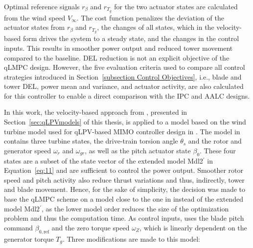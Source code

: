 Optimal reference signals $r_\beta$ and $r_{T_g}$ for the two actuator states are calculated from the wind speed $V_\infty$. The cost function penalizes the deviation of the actuator states from $r_\beta$ and $r_{T_g}$, the changes of all states, which in the velocity-based form drives the system to a steady state, and the changes in the control inputs. This results in smoother power output and reduced tower movement compared to the baseline. DEL reduction is not an explicit objective of the qLMPC design. However, the five evaluation criteria used to compare all control strategies introduced in Section~\ref{subsection Control Objectives}, i.e., blade and tower DEL, power mean and variance, and actuator activity, are also calculated for this controller to enable a direct comparison with the IPC and AALC designs.

In this work, the velocity-based approach from \cite{cisneros2020velocity}, presented in Section~\ref{sec:qLPVmodels} of this thesis, is applied to a model based on the wind turbine model used for qLPV-based MIMO controller design in \cite{Bianchi2007}. The model in \cite{Bianchi2007} contains three turbine states, the drive-train torsion angle $\theta_s$ and the rotor and generator speed $\omega_r$ and $\omega_{gr}$, as well as the pitch actuator state $\beta_0$. These four states are a subset of the state vector of the extended model Mdl2$^\prime$ in Equation~\eqref{eq:11} and are sufficient to control the power output. Smoother rotor speed and pitch activity also reduce thrust variations and thus, indirectly, tower and blade movement. Hence, for the sake of simplicity, the decision was made to base the qLMPC scheme on a model close to the one in \cite{Bianchi2007} instead of the extended model Mdl2$^\prime$, as the lower model order reduces the size of the optimization problem and thus the computation time. As control inputs, \cite{Bianchi2007} uses the blade pitch command $\beta_{0,\text{ref}}$ and the zero torque speed $\omega_Z$, which is linearly dependent on the generator torque $T_g$. Three modifications are made to this model:
